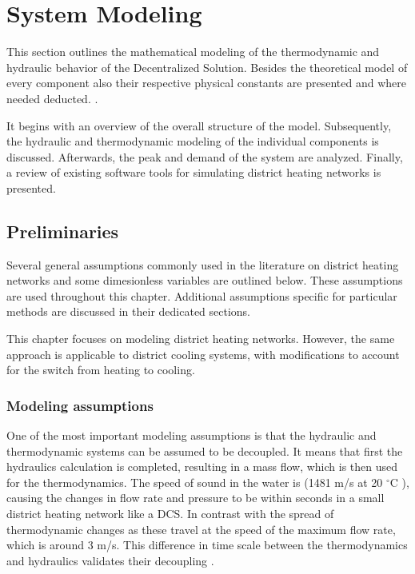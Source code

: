 \chapter{System Modeling}\label{chap::sysmodel}
This section outlines the mathematical modeling  of the thermodynamic and hydraulic behavior of the Decentralized Solution. Besides the theoretical model of every component also their respective physical constants are presented and where needed deducted. . 

It begins with an overview of the overall structure of the model. Subsequently, the hydraulic and thermodynamic modeling of the individual components is discussed. 
Afterwards, the peak and demand of the system are analyzed. Finally, a review of existing software tools for simulating district heating networks is presented. 

\section{Preliminaries}\label{sec::preliminaries}
Several general assumptions commonly used in the literature on  district heating networks and some dimesionless variables are outlined below. These assumptions are used throughout this chapter. Additional assumptions specific for particular methods are discussed in their dedicated sections.

This chapter focuses on modeling district heating networks. However, the same approach is applicable to district cooling systems, with modifications to account for the switch from heating to cooling.

\subsection{Modeling assumptions}
One of the most important modeling assumptions is that the hydraulic and thermodynamic systems can be assumed to be decoupled. It means that first the hydraulics calculation is completed, resulting in a mass flow, which is then used for the thermodynamics. The speed of sound in the water is (1481 m/s at 20 $^{\circ}\text{C}$ \cite{speedofsound}), causing the changes in flow rate and pressure to be within seconds in a small district heating network like a DCS. In contrast with the spread of thermodynamic changes as these travel at the speed of the maximum flow rate, which is around 3 m/s. This difference in time scale between the thermodynamics and hydraulics validates their decoupling \cite{KUNTUAROVA}.

